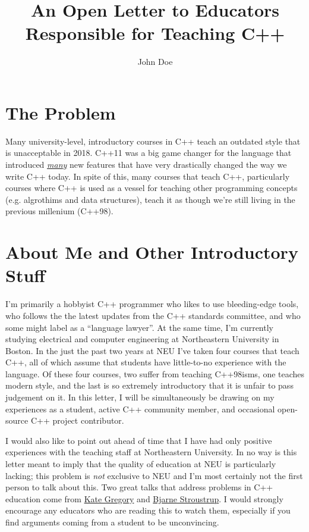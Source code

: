 \documentclass{article}
\title{An Open Letter to Educators Responsible for Teaching C++}
\author{John Doe}
\begin{document}
\raggedright
\maketitle

\section*{The Problem}
Many university-level, introductory courses in C++ teach an outdated style that is unacceptable in 2018.  C++11 was a big game changer for the language that introduced \emph{\href{https://en.wikipedia.org/wiki/C\%2B\%2B11}{many}} new features that have very drastically changed the way we write C++ today.  In spite of this, many courses that teach C++, particularly courses where C++ is used as a vessel for teaching other programming concepts (e.g. algrothims and data structures), teach it as though we're still living in the previous millenium (C++98).

\section*{About Me and Other Introductory Stuff}
I'm primarily a hobbyist C++ programmer who likes to use bleeding-edge tools, who follows the the latest updates from the C++ standards committee, and who some might label as a ``language lawyer''.  At the same time, I'm currently studying electrical and computer engineering at Northeastern University in Boston.  In the just the past two years at NEU I've taken four courses that teach C++, all of which assume that students have little-to-no experience with the language.  Of these four courses, two suffer from teaching C++98isms, one teaches modern style, and the last is so extremely introductory that it is unfair to pass judgement on it.  In this letter, I will be simultaneously be drawing on my experiences as a student, active C++ community member, and occasional open-source C++ project contributor. 

I would also like to point out ahead of time that I have had only positive experiences with the teaching staff at Northeastern University.  In no way is this letter meant to imply that the quality of education at NEU is particularly lacking; this problem is \emph{not} exclusive to NEU and I'm most certainly not the first person to talk about this.  Two great talks that address problems in C++ education come from \href{https://www.youtube.com/watch?v=YnWhqhNdYyk}{Kate Gregory} and \href{https://www.youtube.com/watch?v=fX2W3nNjJIo}{Bjarne Stroustrup}.  I would strongly encourage any educators who are reading this to watch them, especially if you find arguments coming from a student to be unconvincing.
\end{document}
